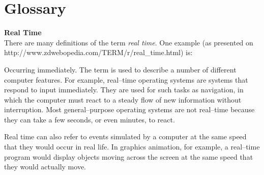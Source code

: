 \chapter{Glossary}

\textbf{Real Time} \\

There are many definitions of the term \textit{real time}. One example (as 
presented on http://www.zdwebopedia.com/TERM/r/real\_time.html) is:

Occurring immediately. The term is used to describe a number of 
different computer features. For example, real--time operating systems are 
systems that respond to input immediately. They are used for such tasks as 
navigation, in which the computer must react to a steady flow of new information 
without interruption. Most general--purpose operating systems are not real--time 
because they can take a few seconds, or even minutes, to react.

Real time can also refer to events simulated by a computer at the same speed 
that they would occur in real life. In graphics animation, for example, a 
real--time program would display objects moving across the screen at the same 
speed that they would actually move.
\\[2ex]